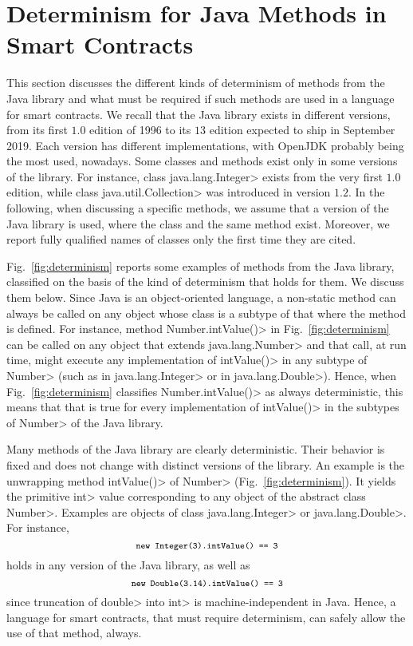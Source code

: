 \section{Determinism for Java Methods in Smart Contracts}\label{sec:determinism}

This section discusses the different kinds of determinism of methods from
the Java library and what must be required if such methods are used
in a language for smart contracts.
We recall that the Java library exists in different versions, from its first
$1.0$ edition of 1996 to its $13$ edition expected to ship in September 2019.
Each version has different implementations, with OpenJDK probably being
the most used, nowadays. Some classes and methods exist only in some versions of the library.
For instance, class \<java.lang.Integer> exists from the very first $1.0$ edition,
while class \<java.util.Collection> was introduced in version $1.2$.
In the following, when discussing a specific methods, we assume that a version
of the Java library is used, where the class and the same method exist.
Moreover, we report fully qualified names of classes only the first time they are cited.

Fig.~\ref{fig:determinism} reports some examples of methods
from the Java library, classified
on the basis of the kind of determinism that holds for them.
We discuss them below. Since Java is an object-oriented language,
a non-static method can always be called on any object whose class
is a subtype of that where the method is defined. For instance, method \<Number.intValue()> in
Fig.~\ref{fig:determinism} can be called on any object that extends
\<java.lang.Number> and that call, at run time, might
execute any implementation of \<intValue()> in any subtype of \<Number>
(such as in \<java.lang.Integer> or in \<java.lang.Double>).
Hence, when Fig.~\ref{fig:determinism} classifies \<Number.intValue()> as always
deterministic, this means that that is true for every implementation of
\<intValue()> in the subtypes of \<Number> of the Java library.

Many methods of the Java library are clearly deterministic. Their behavior is fixed
and does not change with distinct versions of the library. An example is the unwrapping
method \<intValue()> of \<Number> (Fig.~\ref{fig:determinism}). It yields
the primitive \<int> value corresponding to any object of the abstract class \<Number>.
Examples are objects of class \<java.lang.Integer> or \<java.lang.Double>. For instance,
\[
\<new Integer(3).intValue() == 3>
\]
holds in any version of the Java library, as well as
\[
\<new Double(3.14).intValue() == 3>
\]
since truncation of \<double> into \<int> is machine-independent in Java.
Hence, a language for smart contracts, that must require determinism,
can safely allow the use of that method, always.

